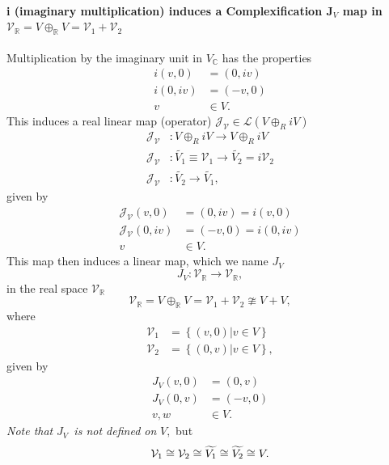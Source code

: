 \documentclass[aps,preprint]{revtex4}
\begin{document}
\paragraph{i (imaginary multiplication) induces a Complexification J$_{V}$
map in$\mathcal{\ }$ $\mathcal{V}_{\mathbb{R}}=V\oplus_{\mathbb{R}}V=%
\mathcal{V}_{1}+\mathcal{V}_{2}$}

Multiplication by the imaginary unit in $V_{\mathbb{C}}$ has the properties 
\begin{align}
i\left( v,0\right) & =\left( 0,iv\right) \\
i\left( 0,iv\right) & =\left( -v,0\right) \\
v & \in V.
\end{align}
This induces a real linear map (operator) $\mathcal{J}_{\mathcal{V}}\in%
\mathcal{L}\left( V\oplus_{R}iV\right) $ 
\begin{align}
\mathcal{J}_{\mathcal{V}} & :V\oplus_{R}iV\rightarrow V\oplus_{R}iV \\
\mathcal{J}_{\mathcal{V}} & :\widetilde{V_{1}}\equiv\mathcal{V}%
_{1}\rightarrow\widetilde{V_{2}}=i\mathcal{V}_{2} \\
\mathcal{J}_{\mathcal{V}} & :\widetilde{V_{2}}\rightarrow\widetilde{V_{1}},
\end{align}
given by 
\begin{align}
\mathcal{J}_{\mathcal{V}}\left( v,0\right) & =\left( 0,iv\right) =i\left(
v,0\right) \\
\mathcal{J}_{\mathcal{V}}\left( 0,iv\right) & =\left( -v,0\right) =i\left(
0,iv\right) \\
v & \in V.
\end{align}
This map then induces a linear map, which we name $J_{V}$ 
\begin{equation}
J_{V}:\mathcal{V}_{\mathbb{R}}\rightarrow\mathcal{V}_{\mathbb{R}},
\end{equation}
in the real space $\mathcal{V}_{\mathbb{R}}$ 
\begin{equation}
\mathcal{V}_{\mathbb{R}}=V\oplus_{\mathbb{R}}V=\mathcal{V}_{1}+\mathcal{V}%
_{2}\ncong V+V,
\end{equation}
where 
\begin{align}
\mathcal{V}_{1} & =\left\{ \left. \left( v,0\right) \right\vert v\in
V\right\} \\
\mathcal{V}_{2} & =\left\{ \left. \left( 0,v\right) \right\vert v\in
V\right\} ,
\end{align}
given by%
\begin{align}
J_{V}\left( v,0\right) & =\left( 0,v\right) \\
J_{V}\left( 0,v\right) & =\left( -v,0\right) \\
v,w & \in V.
\end{align}
\emph{Note that }$J_{V}$\emph{\ is not defined on }$V,$ but 
\begin{equation}
\mathcal{V}_{1}\cong\mathcal{V}_{2}\cong\widetilde{V_{1}}\cong\widetilde{%
V_{2}}\cong V.
\end{equation}
\end{document}
